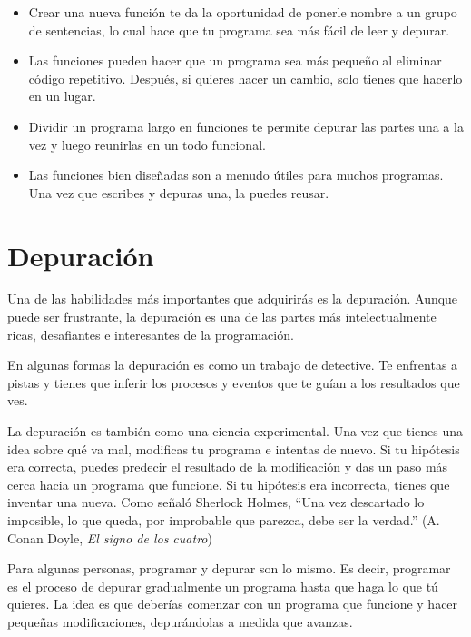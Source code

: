 \documentclass[10pt]{book}
\begin{document}
\begin{itemize}

\item Crear una nueva función te da la oportunidad de ponerle nombre a un grupo
de sentencias, lo cual hace que tu programa sea más fácil de leer y depurar.

\item Las funciones pueden hacer que un programa sea más pequeño al eliminar código
repetitivo.  Después, si quieres hacer un cambio, solo tienes
que hacerlo en un lugar.

\item Dividir un programa largo en funciones te permite depurar las
partes una a la vez y luego reunirlas en un todo funcional.

\item Las funciones bien diseñadas son a menudo útiles para muchos programas.
Una vez que escribes y depuras una, la puedes reusar.

\end{itemize}


\section{Depuración}

Una de las habilidades más importantes que adquirirás es la depuración.
Aunque puede ser frustrante, la depuración es una de las partes más
intelectualmente ricas, desafiantes e interesantes de
la programación.

En algunas formas la depuración es como un trabajo de detective.  Te enfrentas
a pistas y tienes que inferir los procesos y eventos que te guían
a los resultados que ves.

La depuración es también como una ciencia experimental.  Una vez que tienes una idea
sobre qué va mal, modificas tu programa e intentas de nuevo.  Si
tu hipótesis era correcta, puedes predecir el resultado de la
modificación y das un paso más cerca hacia un programa que funcione.  Si
tu hipótesis era incorrecta, tienes que inventar una nueva.  Como
señaló Sherlock Holmes, ``Una vez descartado lo
imposible, lo que queda, por improbable que parezca, debe ser la verdad.''
(A. Conan Doyle, {\em El signo de los cuatro})

Para algunas personas, programar y depurar son lo mismo.  Es
decir, programar es el proceso de depurar gradualmente un programa hasta que
haga lo que tú quieres.  La idea es que deberías comenzar con un
programa que funcione y hacer pequeñas modificaciones,
depurándolas a medida que avanzas.
\end{document}
